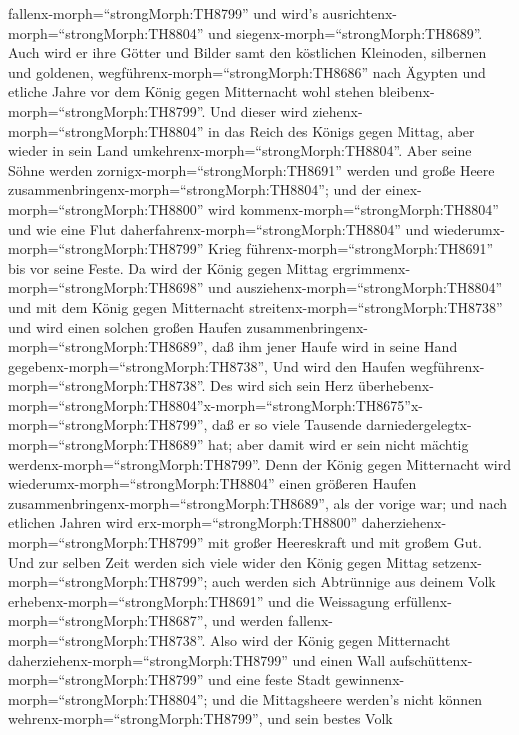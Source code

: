 fallenx-morph=``strongMorph:TH8799'' und wird's
ausrichtenx-morph=``strongMorph:TH8804'' und
siegenx-morph=``strongMorph:TH8689''.  Auch wird er ihre
Götter und Bilder samt den köstlichen Kleinoden, silbernen und goldenen,
wegführenx-morph=``strongMorph:TH8686'' nach Ägypten und etliche Jahre
vor dem König gegen Mitternacht wohl stehen
bleibenx-morph=``strongMorph:TH8799''.  Und dieser wird
ziehenx-morph=``strongMorph:TH8804'' in das Reich des Königs gegen
Mittag, aber wieder in sein Land umkehrenx-morph=``strongMorph:TH8804''.
 Aber seine Söhne werden
zornigx-morph=``strongMorph:TH8691'' werden und große Heere
zusammenbringenx-morph=``strongMorph:TH8804''; und der
einex-morph=``strongMorph:TH8800'' wird
kommenx-morph=``strongMorph:TH8804'' und wie eine Flut
daherfahrenx-morph=``strongMorph:TH8804'' und
wiederumx-morph=``strongMorph:TH8799'' Krieg
führenx-morph=``strongMorph:TH8691'' bis vor seine Feste. 
Da wird der König gegen Mittag ergrimmenx-morph=``strongMorph:TH8698''
und ausziehenx-morph=``strongMorph:TH8804'' und mit dem König gegen
Mitternacht streitenx-morph=``strongMorph:TH8738'' und wird einen
solchen großen Haufen zusammenbringenx-morph=``strongMorph:TH8689'', daß
ihm jener Haufe wird in seine Hand
gegebenx-morph=``strongMorph:TH8738'',  Und wird den Haufen
wegführenx-morph=``strongMorph:TH8738''. Des wird sich sein Herz
überhebenx-morph=``strongMorph:TH8804''\textbar x-morph=``strongMorph:TH8675''x-morph=``strongMorph:TH8799'',
daß er so viele Tausende darniedergelegtx-morph=``strongMorph:TH8689''
hat; aber damit wird er sein nicht mächtig
werdenx-morph=``strongMorph:TH8799''.  Denn der König gegen
Mitternacht wird wiederumx-morph=``strongMorph:TH8804'' einen größeren
Haufen zusammenbringenx-morph=``strongMorph:TH8689'', als der vorige
war; und nach etlichen Jahren wird erx-morph=``strongMorph:TH8800''
daherziehenx-morph=``strongMorph:TH8799'' mit großer Heereskraft und mit
großem Gut.  Und zur selben Zeit werden sich viele wider
den König gegen Mittag setzenx-morph=``strongMorph:TH8799''; auch werden
sich Abtrünnige aus deinem Volk erhebenx-morph=``strongMorph:TH8691''
und die Weissagung erfüllenx-morph=``strongMorph:TH8687'', und werden
fallenx-morph=``strongMorph:TH8738''.  Also wird der König
gegen Mitternacht daherziehenx-morph=``strongMorph:TH8799'' und einen
Wall aufschüttenx-morph=``strongMorph:TH8799'' und eine feste Stadt
gewinnenx-morph=``strongMorph:TH8804''; und die Mittagsheere werden's
nicht können wehrenx-morph=``strongMorph:TH8799'', und sein bestes Volk
